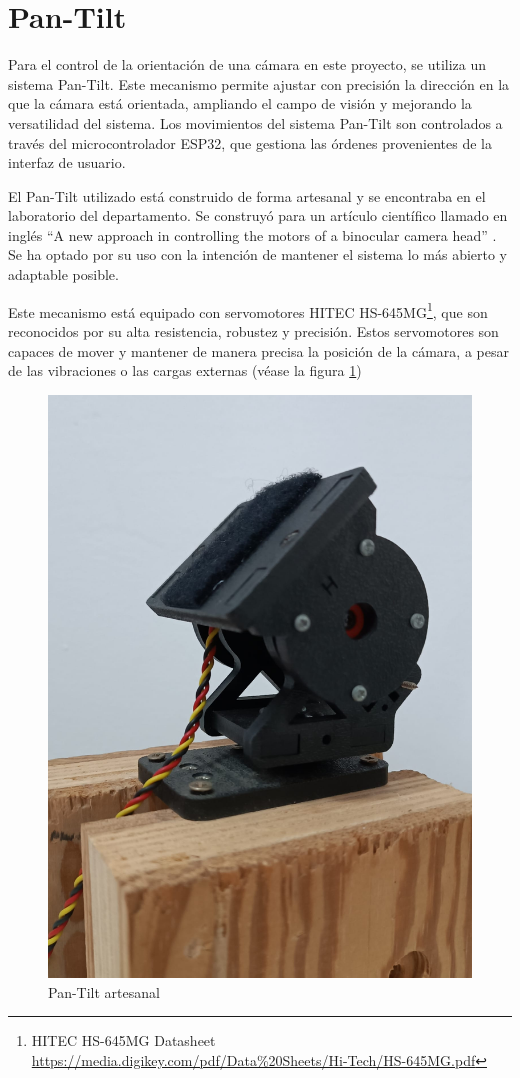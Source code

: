 \section{Pan-Tilt}

Para el control de la orientación de una cámara en este proyecto, se utiliza un sistema Pan-Tilt. Este mecanismo permite ajustar con precisión la dirección en la que la cámara está orientada, ampliando el campo de visión y mejorando la versatilidad del sistema. Los movimientos del sistema Pan-Tilt son controlados a través del microcontrolador ESP32, que gestiona las órdenes provenientes de la interfaz de usuario.



El Pan-Tilt utilizado está construido de forma artesanal y se encontraba en el laboratorio del departamento. Se construyó para un artículo científico llamado en inglés ``A new approach in controlling the motors of a binocular camera head'' \cite{PanTilt2004}. Se ha optado por su uso con la intención de mantener el sistema lo más abierto y adaptable posible.



Este mecanismo está equipado con servomotores HITEC HS-645MG\footnote{HITEC HS-645MG Datasheet \url{https://media.digikey.com/pdf/Data\%20Sheets/Hi-Tech/HS-645MG.pdf}}, que son reconocidos por su alta resistencia, robustez y precisión. Estos servomotores son capaces de mover y mantener de manera precisa la posición de la cámara, a pesar de las vibraciones o las cargas externas (véase la figura \ref{figure:pan-tilt})

\begin{figure}[!htb]
   \centering
    \includegraphics[width=0.3\linewidth]{figures/pan-tilt.jpg}
   \caption{Pan-Tilt artesanal}
   \label{figure:pan-tilt}
\end{figure}